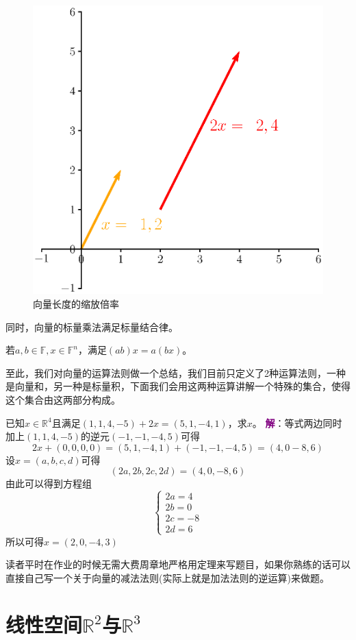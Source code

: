 \begin{figure}[htbp]
	\centering
	\includegraphics[width=0.7\linewidth]{figure/eps/MulFSn}
	\caption{向量长度的缩放倍率}
	\label{fig:mulfsn}
\end{figure}

同时，向量的标量乘法满足标量结合律。
\begin{corollary}
	若$a,b\in \mathbb{F},x\in \mathbb{F}^n$，满足$(ab)x=a(bx)$。
\end{corollary}

至此，我们对向量的运算法则做一个总结，我们目前只定义了2种运算法则，一种是向量和，另一种是标量积，下面我们会用这两种运算讲解一个特殊的集合，使得这个集合由这两部分构成。

\begin{example}
	已知$x\in \mathbb{R}^4$且满足$(1,1,4,-5)+2x=(5,1,-4,1)$，求$x$。
	\tcblower
	\textcolor{purple}{\textbf{解}}：等式两边同时加上$(1,1,4,-5)$的逆元$(-1,-1,-4,5)$可得$$2x+(0,0,0,0)=(5,1,-4,1)+(-1,-1,-4,5)=(4,0-8,6)$$设$x=(a,b,c,d)$可得$$(2a,2b,2c,2d)=(4,0,-8,6)$$由此可以得到方程组$$\left\{\begin{matrix} 
		2a=4 \\
		2b=0 \\
		2c=-8 \\
		2d=6
	\end{matrix}\right. $$所以可得$x=(2,0,-4,3)$
\end{example}

读者平时在作业的时候无需大费周章地严格用定理来写题目，如果你熟练的话可以直接自己写一个关于向量的减法法则(实际上就是加法法则的逆运算)来做题。

\section{线性空间$\mathbb{R}^2$与$\mathbb{R}^3$}
